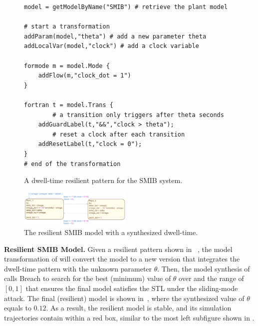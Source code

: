 \begin{figure}[!t]%
\begin{lstlisting}[basicstyle=\ttfamily\footnotesize, numbers=none]
model = getModelByName("SMIB") # retrieve the plant model
	
# start a transformation  
addParam(model,"theta") # add a new parameter theta
addLocalVar(model,"clock") # add a clock variable
	
formode m = model.Mode {
    addFlow(m,"clock_dot = 1")
}

fortran t = model.Trans {
		# a transition only triggers after theta seconds
    addGuardLabel(t,"&&","clock > theta"); 
		# reset a clock after each transition
    addResetLabel(t,"clock = 0"); 
}
# end of the transformation
\end{lstlisting}
\caption{A dwell-time resilient pattern for the SMIB system.}%
%
\end{figure}


\begin{figure}[t!]%
	\centering%
    \includegraphics[width=0.48\textwidth]{image/smib_plant_model_res}%
	\caption{The resilient SMIB model with a synthesized dwell-time.}%
\end{figure}%

\vspace{0.5em}
\noindent
{\bf Resilient SMIB Model.} Given a resilient pattern shown in ~, the model transformation of \toolreaffirm will convert the model to a new version that integrates the dwell-time pattern with the unknown parameter $\theta$.
%
Then, the model synthesis of \toolreaffirm calls Breach to search for the best (\ie minimum) value of $\theta$ over and the range of $[0, 1]$ that ensures the final model satisfies the STL  under the sliding-mode attack. The final (resilient) model is shown in~, where the synthesized value of $\theta$ equals to $0.12$. As a result, the resilient model is stable, and its simulation trajectories contain within a red box, similar to the most left subfigure shown in .


